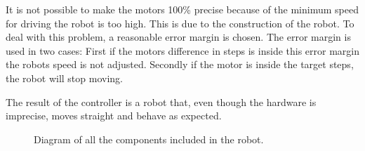 It is not possible to make the motors 100\% precise because of the minimum speed for driving the robot is too high. This is due to the construction of the robot. To deal with this problem, a reasonable error margin is chosen. The error margin is used in two cases: First if the motors difference in steps is inside this error margin the robots speed is not adjusted. Secondly if the motor is inside the target steps, the robot will stop moving.  

The result of the controller is a robot that, even though the hardware is imprecise, moves straight and behave as expected.

\begin{figure}[H]
     \caption{\label{fig:robot_overview} Diagram of all the components included in the robot.}
\end{figure}

